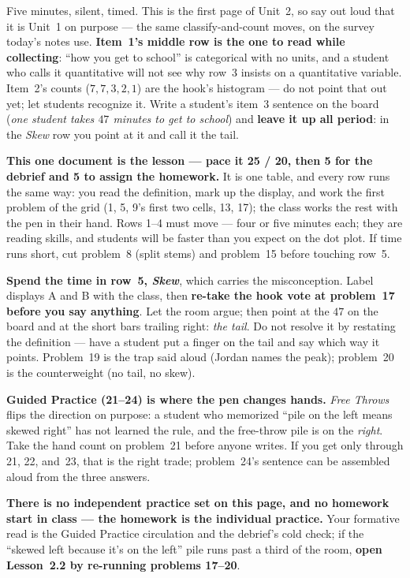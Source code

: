\documentclass[10pt]{article}
\begin{document}
\begin{teachernote}[Warm-Up]
Five minutes, silent, timed. This is the first page of Unit~2, so say out loud that it is Unit~1
on purpose --- the same classify-and-count moves, on the survey today's notes use. \textbf{Item~1's
middle row is the one to read while collecting}: ``how you get to school'' is categorical with no
units, and a student who calls it quantitative will not see why row~3 insists on a quantitative
variable. Item~2's counts ($7, 7, 3, 2, 1$) are the hook's histogram --- do not point that out
yet; let students recognize it. Write a student's item~3 sentence on the board (\emph{one student
takes $47$ minutes to get to school}) and \textbf{leave it up all period}: in the \emph{Skew} row
you point at it and call it the tail.
\end{teachernote}

\begin{teachernote}
\textbf{This one document is the lesson --- pace it 25 / 20, then 5 for the debrief and 5 to
assign the homework.} It is one table, and every row runs the same way: you read the definition,
mark up the display, and work the first problem of the grid (1, 5, 9's first two cells, 13, 17);
the class works the rest with the pen in their hand. Rows 1--4 must move --- four or five minutes
each; they are reading skills, and students will be faster than you expect on the dot plot. If
time runs short, cut problem~8 (split stems) and problem~15 before touching row~5.

\textbf{Spend the time in row~5, \emph{Skew}}, which carries the misconception. Label displays A
and B with the class, then \textbf{re-take the hook vote at problem~17 before you say anything}.
Let the room argue; then point at the $47$ on the board and at the short bars trailing right:
\emph{the tail}. Do not resolve it by restating the definition --- have a student put a finger on
the tail and say which way it points. Problem~19 is the trap said aloud (Jordan names the peak);
problem~20 is the counterweight (no tail, no skew).

\textbf{Guided Practice (21--24) is where the pen changes hands.} \emph{Free Throws} flips the
direction on purpose: a student who memorized ``pile on the left means skewed right'' has not
learned the rule, and the free-throw pile is on the \emph{right}. Take the hand count on
problem~21 before anyone writes. If you get only through 21, 22, and~23, that is the right trade;
problem~24's sentence can be assembled aloud from the three answers.

\textbf{There is no independent practice set on this page, and no homework start in class ---
the homework is the individual practice.} Your formative read is the Guided Practice
circulation and the debrief's cold check; if the ``skewed left because it's on the left'' pile
runs past a third of the room, \textbf{open Lesson~2.2 by re-running problems 17--20}.
\end{teachernote}
\end{document}
